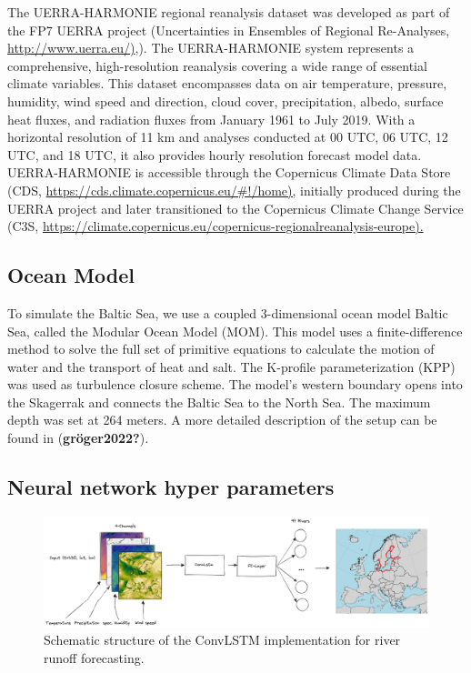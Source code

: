 \documentclass[
]{agujournal2019}
\begin{document}
The UERRA-HARMONIE regional reanalysis dataset was developed as part of
the FP7 UERRA project (Uncertainties in Ensembles of Regional
Re-Analyses, \href{http://www.uerra.eu/}{http://www.uerra.eu/)},). The
UERRA-HARMONIE system represents a comprehensive, high-resolution
reanalysis covering a wide range of essential climate variables. This
dataset encompasses data on air temperature, pressure, humidity, wind
speed and direction, cloud cover, precipitation, albedo, surface heat
fluxes, and radiation fluxes from January 1961 to July 2019. With a
horizontal resolution of 11 km and analyses conducted at 00 UTC, 06 UTC,
12 UTC, and 18 UTC, it also provides hourly resolution forecast model
data. UERRA-HARMONIE is accessible through the Copernicus Climate Data
Store (CDS, \url{https://cds.climate.copernicus.eu/\#!/home),} initially
produced during the UERRA project and later transitioned to the
Copernicus Climate Change Service (C3S,
\url{https://climate.copernicus.eu/copernicus-regionalreanalysis-europe).}

\hypertarget{ocean-model}{%
\subsection{Ocean Model}\label{ocean-model}}

To simulate the Baltic Sea, we use a coupled 3-dimensional ocean model
Baltic Sea, called the Modular Ocean Model (MOM). This model uses a
finite-difference method to solve the full set of primitive equations to
calculate the motion of water and the transport of heat and salt. The
K-profile parameterization (KPP) was used as turbulence closure scheme.
The model's western boundary opens into the Skagerrak and connects the
Baltic Sea to the North Sea. The maximum depth was set at 264 meters. A
more detailed description of the setup can be found in
(\textbf{gröger2022?}).

\hypertarget{neural-network-hyper-parameters}{%
\subsection{Neural network hyper
parameters}\label{neural-network-hyper-parameters}}

\begin{figure}

{\centering \includegraphics{ConvLSTM.png}

}

\caption{\label{fig-baltNet}Schematic structure of the ConvLSTM
implementation for river runoff forecasting.}

\end{figure}
\end{document}
